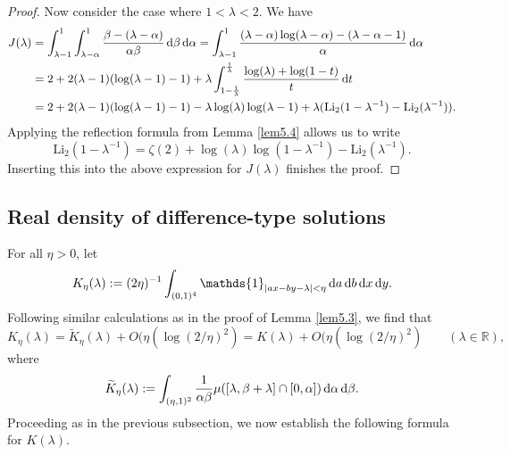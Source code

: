 \documentclass[12pt,reqno]{amsart}
\theoremstyle{definition}
\theoremstyle{remark}
\numberwithin{equation}{section}
\def \R {\mathbb{R}}
\def\d{{\,{\rm d}}}
\def \Li {\mathrm{Li}}
\newcommand\1{\mathds{1}}
\begin{document}
\begin{proof}
    Now consider the case where $1<\lambda<2$. We have
    \begin{align*}
        J(\lambda) &= \int_{\lambda - 1}^1\int_{\lambda - \alpha}^1\frac{\beta-(\lambda-\alpha)}{\alpha\beta}\d\beta\d\alpha = \int_{\lambda -1}^1\frac{(\lambda-\alpha)\log(\lambda-\alpha) - (\lambda - \alpha - 1)}{\alpha}\d\alpha\\
        &= 2 + 2(\lambda-1)(\log(\lambda-1) - 1) + \lambda\int_{1-\frac{1}{\lambda}}^{\frac{1}{\lambda}}\frac{\log(\lambda)+\log(1-t)}{t}\d t\\
        & = 2 + 2(\lambda-1)(\log(\lambda-1) - 1) -\lambda\log(\lambda)\log(\lambda-1) + \lambda(\Li_2(1-\lambda^{-1}) - \Li_2(\lambda^{-1})).
    \end{align*}
    Applying the reflection formula from Lemma \ref{lem5.4} allows us to write
    \begin{equation*}
       \Li_2(1-\lambda^{-1}) = \zeta(2) + \log(\lambda)\log(1-\lambda^{-1}) - \Li_2(\lambda^{-1}).
    \end{equation*}
    Inserting this into the above expression for $J(\lambda)$ finishes the proof.
\end{proof}

\subsection{Real density of difference-type solutions}

For all $\eta>0$, let
\[ K_{\eta}(\lambda) :=    (2\eta)^{-1} \int_{(0,1)^4} \1_{|ax - by - \lambda| < \eta} \d a \d b \d x \d y. \]
Following similar calculations as in the proof of Lemma \ref{lem5.3}, we find that
\begin{equation}\label{eqn5.5}
    K_\eta(\lambda) = \widetilde K_\eta(\lambda) + O(\eta(\log(2/\eta)^2)= K(\lambda) + O(\eta(\log(2/\eta)^2) \qquad(\lambda\in\R),
\end{equation}
where
\begin{equation*}
    \widetilde{K}_\eta(\lambda):=\int_{(\eta,1)^2}\frac{1}{\alpha\beta}\mu([\lambda,\beta+\lambda]\cap [0,\alpha])\d\alpha\d\beta.
\end{equation*}
Proceeding as in the previous subsection, we now establish the following formula for $K(\lambda)$.
\end{document}

